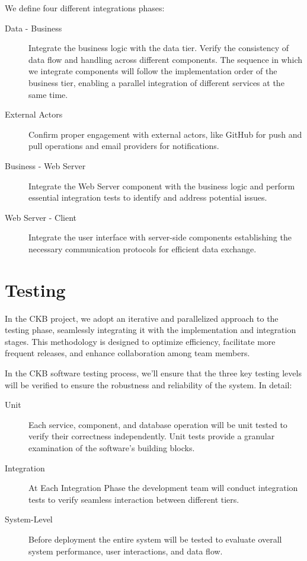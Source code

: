 \documentclass[11pt]{report}
\begin{document}
\noindent
We define four different integrations phases:
\begin{description}
    \item[Data - Business] Integrate the business logic with the data tier.
    Verify the consistency of data flow and handling across different components.
    The sequence in which we integrate components will follow the implementation order of the business tier, enabling a parallel integration of different services at the same time.
    \item[External Actors] Confirm proper engagement with external actors, like GitHub for push and pull operations and email providers for notifications.
    \item[Business - Web Server] Integrate the Web Server component with the business logic and perform essential integration tests to identify and address potential issues.
    \item[Web Server - Client] Integrate the user interface with server-side components establishing the necessary communication protocols for efficient data exchange.
\end{description}

\section{Testing}
In the CKB project, we adopt an iterative and parallelized approach to the testing phase, seamlessly integrating it with the implementation and integration stages.
This methodology is designed to optimize efficiency, facilitate more frequent releases, and enhance collaboration among team members.

In the CKB software testing process, we'll ensure that the three key testing levels will be verified to ensure the robustness and reliability of the system. 
In detail:
\begin{description}
    \item[Unit] Each service, component, and database operation will be unit tested to verify their correctness independently.
    Unit tests provide a granular examination of the software's building blocks.
    \item[Integration] At Each Integration Phase the development team will conduct integration tests to verify seamless interaction between different tiers.
    \item[System-Level] Before deployment the entire system will be tested to evaluate overall system performance, user interactions, and data flow.
\end{description}
\end{document}
